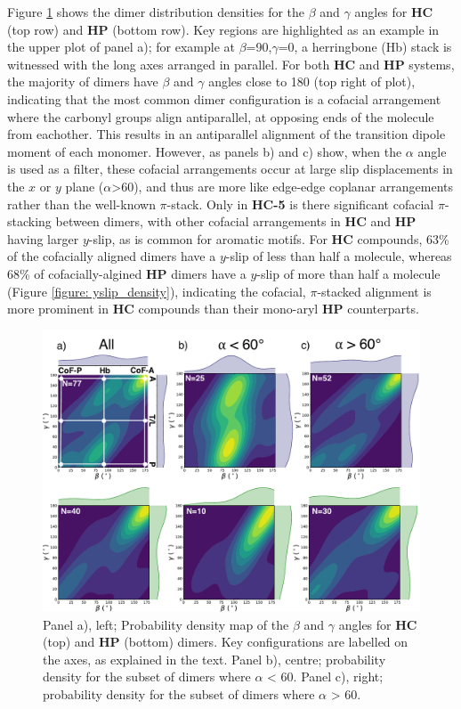 Figure \ref{figure: dimer_classification} shows the dimer distribution densities for the $\beta$ and $\gamma$ angles for \textbf{HC} (top row) and \textbf{HP} (bottom row). Key regions are highlighted as an example in the upper plot of panel a); for example at $\beta$=90,$\gamma$=0, a herringbone (Hb) stack is witnessed with the long axes arranged in parallel. For both \textbf{HC} and \textbf{HP} systems, the majority of dimers have $\beta$ and $\gamma$ angles close to 180\degree{} (top right of plot), indicating that the most common dimer configuration is a cofacial arrangement where the carbonyl groups align antiparallel, at opposing ends of the molecule from eachother. This results in an antiparallel alignment of the \sone{} transition dipole moment of each monomer.  However, as panels b) and c) show, when the $\alpha$ angle is used as a filter, these cofacial arrangements occur at large slip displacements in the $x$ or $y$  plane ($\alpha$\textgreater{60}), and thus are more like edge-edge coplanar arrangements rather than the well-known $\pi$-stack. Only in \textbf{HC-5} is there significant cofacial $\pi$-stacking between dimers, with other cofacial arrangements in \textbf{HC} and \textbf{HP} having larger $y$-slip, as is common  for aromatic motifs. For \textbf{HC} compounds, 63\% of the cofacially aligned dimers have a $y$-slip of less than half a molecule, whereas 68\% of cofacially-algined \textbf{HP} dimers have a $y$-slip of more than half a molecule (Figure \ref{figure: yslip_density}), indicating the cofacial, $\pi$-stacked alignment is more prominent in \textbf{HC} compounds than their mono-aryl \textbf{HP} counterparts. 
\begin{figure}[H]
\centering
  \includegraphics[width=0.9\linewidth]{5ConnectingCrystalStructure/dimer_classification}
  \caption[Probability density maps of $\beta$ and $\gamma$ angles.]{Panel a), left; Probability density map of the $\beta$ and $\gamma$ angles for \textbf{HC} (top) and \textbf{HP} (bottom) dimers. Key configurations are labelled on the axes, as explained in the text. Panel b), centre; probability density for the subset of dimers where $\alpha$ \textless{}  60\degree{}.  Panel c), right; probability density for the subset of dimers where $\alpha$ \textgreater{} 60\degree{}.}
  \label{figure: dimer_classification}
\end{figure}
